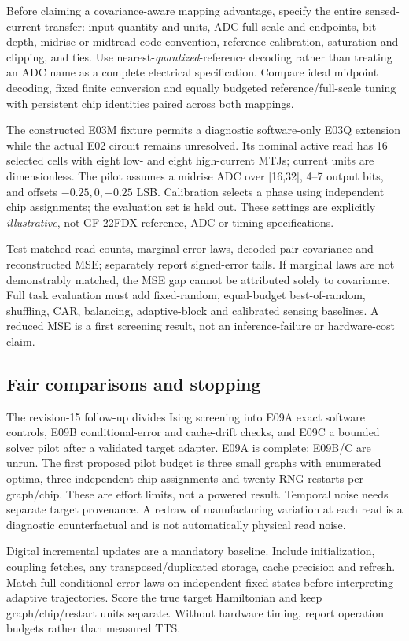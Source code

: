 Before claiming a covariance-aware mapping advantage, specify the entire sensed-current
transfer: input quantity and units, ADC full-scale and endpoints, bit depth, midrise or
midtread code convention, reference calibration, saturation and clipping, and ties.
Use nearest-\emph{quantized}-reference decoding rather than treating an ADC name as
a complete electrical specification. Compare ideal midpoint decoding, fixed finite
conversion and equally budgeted reference/full-scale tuning with persistent chip
identities paired across both mappings.

The constructed E03M fixture permits a diagnostic software-only E03Q extension while
the actual E02 circuit remains unresolved. Its nominal active read has 16 selected
cells with eight low- and eight high-current MTJs; current units are dimensionless.
The pilot assumes a midrise ADC over [16,32], 4--7 output bits, and offsets
$-0.25,0,+0.25$ LSB. Calibration selects a phase using independent chip assignments;
the evaluation set is held out. These settings are explicitly \emph{illustrative}, not
GF 22FDX reference, ADC or timing specifications.

Test matched read counts, marginal error laws, decoded pair covariance and reconstructed
MSE; separately report signed-error tails. If marginal laws are not demonstrably matched,
the MSE gap cannot be attributed solely to covariance. Full task evaluation must
add fixed-random, equal-budget best-of-random, shuffling, CAR, balancing, adaptive-block
and calibrated sensing baselines. A reduced MSE is a first screening result, not an
inference-failure or hardware-cost claim.

\subsection{Fair comparisons and stopping}

The revision-15 follow-up divides Ising screening into E09A exact software controls,
E09B conditional-error and cache-drift checks, and E09C a bounded solver pilot after a
validated target adapter. E09A is complete; E09B/C are unrun. The first proposed pilot
budget is three small graphs with enumerated optima, three independent chip assignments
and twenty RNG restarts per graph/chip. These are effort limits, not a powered result.
Temporal noise needs separate target provenance. A redraw of manufacturing variation
at each read is a diagnostic counterfactual and is not automatically physical read noise.

Digital incremental updates are a mandatory baseline. Include initialization, coupling
fetches, any transposed/duplicated storage, cache precision and refresh. Match full
conditional error laws on independent fixed states before interpreting adaptive
trajectories. Score the true target Hamiltonian and keep graph/chip/restart units
separate. Without hardware timing, report operation budgets rather than measured TTS.

